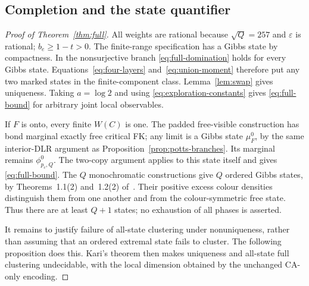 \subsection{Completion and the state quantifier}\label{sec:full-completion}
\begin{proof}[Proof of Theorem~\ref{thm:full}]
All weights are rational because $\sqrt Q=257$ and $\varepsilon$ is rational; $b_e\ge1-t>0$. The finite-range specification has a Gibbs state by compactness. In the nonsurjective branch \eqref{eq:full-domination} holds for every Gibbs state. Equations~\eqref{eq:four-layers} and~\eqref{eq:union-moment} therefore put any two marked states in the finite-component class. Lemma~\ref{lem:swap} gives uniqueness. Taking $a=\log2$ and using \eqref{eq:exploration-constants} gives \eqref{eq:full-bound} for arbitrary joint local observables.

If $F$ is onto, every finite $W(C)$ is one. The padded free-visible construction has bond marginal exactly free critical FK; any limit is a Gibbs state $\mu_F^0$, by the same interior-DLR argument as Proposition~\ref{prop:potts-branches}. Its marginal remains $\phi^0_{p_c,Q}$. The two-copy argument applies to this state itself and gives \eqref{eq:full-bound}. The $Q$ monochromatic constructions give $Q$ ordered Gibbs states, by Theorems~1.1(2) and~1.2(2) of~\cite{DGHMT}. Their positive excess colour densities distinguish them from one another and from the colour-symmetric free state. Thus there are at least $Q+1$ states; no exhaustion of all phases is asserted.

It remains to justify failure of all-state clustering under nonuniqueness, rather than assuming that an ordered extremal state fails to cluster. The following proposition does this. Kari's theorem then makes uniqueness and all-state full clustering undecidable, with the local dimension obtained by the unchanged CA-only encoding.
\end{proof}

